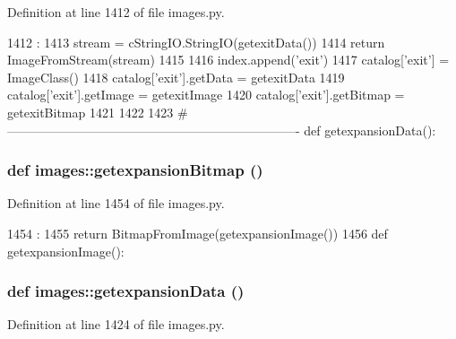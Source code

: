 Definition at line 1412 of file images.py.


\begin{DoxyCode}
1412                   :
1413     stream = cStringIO.StringIO(getexitData())
1414     return ImageFromStream(stream)
1415 
1416 index.append('exit')
1417 catalog['exit'] = ImageClass()
1418 catalog['exit'].getData = getexitData
1419 catalog['exit'].getImage = getexitImage
1420 catalog['exit'].getBitmap = getexitBitmap
1421 
1422 
1423 #----------------------------------------------------------------------
def getexpansionData():
\end{DoxyCode}
\hypertarget{namespaceimages_a6a95ffa0745f5048d41fad05294a47d4}{
\subsubsection[{getexpansionBitmap}]{\setlength{\rightskip}{0pt plus 5cm}def images::getexpansionBitmap ()}}
\label{namespaceimages_a6a95ffa0745f5048d41fad05294a47d4}


Definition at line 1454 of file images.py.


\begin{DoxyCode}
1454                         :
1455     return BitmapFromImage(getexpansionImage())
1456 
def getexpansionImage():
\end{DoxyCode}
\hypertarget{namespaceimages_aaa661f7474d24c9503cf37c5087026c4}{
\subsubsection[{getexpansionData}]{\setlength{\rightskip}{0pt plus 5cm}def images::getexpansionData ()}}
\label{namespaceimages_aaa661f7474d24c9503cf37c5087026c4}


Definition at line 1424 of file images.py.


